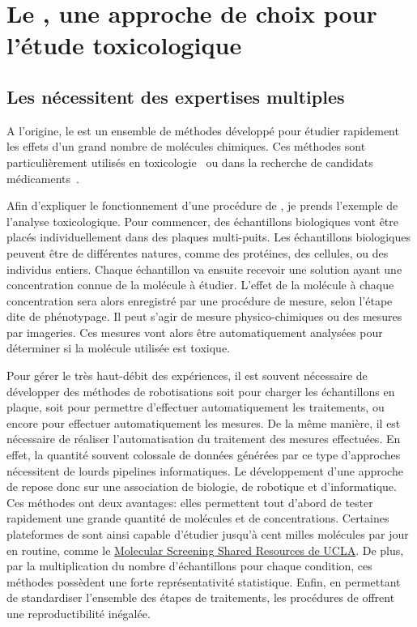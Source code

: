 \documentclass[\main/main.tex]{subfiles}
\begin{document}
            
\section{Le \hcs{}, une approche de choix pour l'étude toxicologique}

    \subsection{Les \hcss{} nécessitent des expertises multiples}
    
%
A l'origine, le \hcs{} est un ensemble de méthodes développé pour étudier rapidement les effets d'un grand nombre de molécules chimiques.
%
Ces méthodes sont particulièrement utilisés en toxicologie~\cite{na_2016} ou dans la recherche de candidats médicaments~\cite{macarron_2011}.

%
Afin d'expliquer le fonctionnement d'une procédure de \hcs{}, je prends l'exemple de l'analyse toxicologique.
%
Pour commencer, des échantillons biologiques vont être placés individuellement dans des plaques multi-puits.
%
Les échantillons biologiques peuvent être de différentes natures, comme des protéines, des cellules, ou des individus entiers.
Chaque échantillon va ensuite recevoir une solution ayant une concentration connue de la molécule à étudier.
%
L'effet de la molécule à chaque concentration sera alors enregistré par une procédure de mesure, selon l'étape dite de phénotypage.
%
Il peut s'agir de mesure physico-chimiques ou des mesures par imageries.
%
Ces mesures vont alors être automatiquement analysées pour déterminer si la molécule utilisée est toxique.

%
Pour gérer le très haut-débit des expériences, il est souvent nécessaire de développer des méthodes de robotisations soit pour charger les échantillons en plaque, soit pour permettre d'effectuer automatiquement les traitements, ou encore pour effectuer automatiquement les mesures.
%
De la même manière, il est nécessaire de réaliser l'automatisation du traitement des mesures effectuées.
%
En effet, la quantité souvent colossale de données générées par ce type d'approches nécessitent de lourds pipelines informatiques.
%
Le développement d'une approche de \hcs{} repose donc sur une association de biologie, de robotique et d'informatique.
%
Ces méthodes ont deux avantages:
%
elles permettent tout d'abord de tester rapidement une grande quantité de molécules et de concentrations.
%
Certaines plateformes de \hcs{} sont ainsi capable d'étudier jusqu'à cent milles molécules par jour en routine,
comme le \href{https://www.mssr.ucla.edu/}{Molecular Screening Shared Resources de UCLA}.
%
De plus, par la multiplication du nombre d'échantillons pour chaque condition, ces méthodes possèdent une forte représentativité statistique.
%
Enfin, en permettant de standardiser l'ensemble des étapes de traitements, les procédures de \hcs{} offrent une reproductibilité inégalée.
\end{document}
